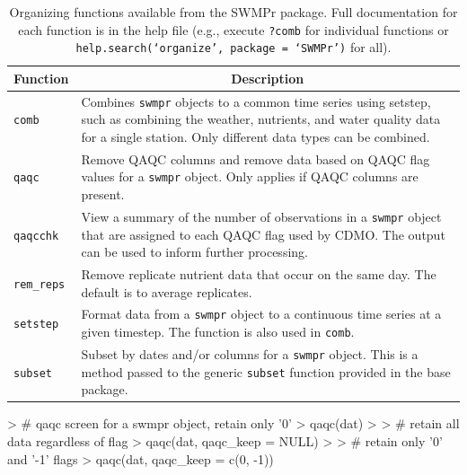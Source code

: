 \begin{table}[!tbp]
\caption{Organizing functions available from the SWMPr package. Full documentation for each function is in the help file (e.g., execute \texttt{?comb} for individual functions or \texttt{help.search(`organize', package = `SWMPr')} for all).\label{tab:organize}} 
\begin{center}
\begin{tabular}{lp{3.5in}}
\hline\hline
\multicolumn{1}{l}{Function}&\multicolumn{1}{c}{Description}\tabularnewline
\hline
\texttt{comb}&Combines \texttt{swmpr} objects to a common time series using setstep, such as combining the weather, nutrients, and water quality data for a single station. Only different data types can be combined.\tabularnewline
\texttt{qaqc}&Remove QAQC columns and remove data based on QAQC flag values for a \texttt{swmpr} object.  Only applies if QAQC columns are present. \tabularnewline
\texttt{qaqcchk}&View a summary of the number of observations in a \texttt{swmpr} object that are assigned to each QAQC flag used by CDMO.  The output can be used to inform further processing.\tabularnewline
\texttt{rem\_reps}&Remove replicate nutrient data that occur on the same day.  The default is to average replicates.\tabularnewline
\texttt{setstep}&Format data from a \texttt{swmpr} object to a continuous time series at a given timestep.  The function is also used in \texttt{comb}.\tabularnewline
\texttt{subset}&Subset by dates and/or columns for a \texttt{swmpr} object.  This is a method passed to the generic \texttt{subset} function provided in the base package.\tabularnewline
\hline
\end{tabular}\end{center}

\end{table}


\begin{example}
> # qaqc screen for a swmpr object, retain only '0'
> qaqc(dat)
> 
> # retain all data regardless of flag
> qaqc(dat, qaqc_keep = NULL)
> 
> # retain only '0' and '-1' flags
> qaqc(dat, qaqc_keep = c(0, -1))
\end{example}

